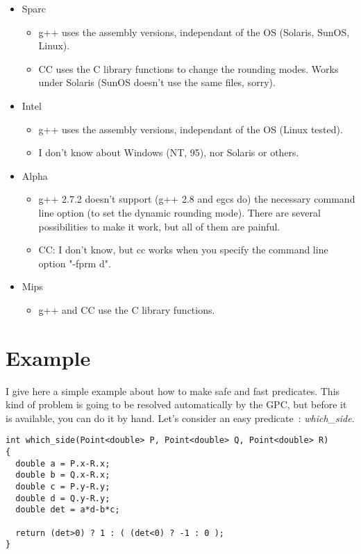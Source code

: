 \begin{itemize}
\item Sparc
\begin{itemize}
\item g++ uses the assembly versions, independant of the OS (Solaris, SunOS,
      Linux).
\item CC uses the C library functions to change the rounding modes.  Works
      under Solaris (SunOS doesn't use the same files, sorry).
\end{itemize}
\item Intel
\begin{itemize}
\item g++ uses the assembly versions, independant of the OS (Linux tested).
\item I don't know about Windows (NT, 95), nor Solaris or others.
\end{itemize}
\item Alpha
\begin{itemize}
\item g++ 2.7.2 doesn't support (g++ 2.8 and egcs do) the necessary command line
	option (to set the dynamic rounding mode).  There are several
	possibilities to make it work, but all of them are painful.
\item CC: I don't know, but cc works when you specify the command line option
      "-fprm d".
\end{itemize}
\item Mips
\begin{itemize}
\item g++ and CC use the C library functions.
\end{itemize}
\end{itemize}


\section{Example}

I give here a simple example about how to make safe and fast predicates.
This kind of problem is going to be resolved automatically by the GPC,
but before it is available, you can do it by hand.
Let's consider an easy predicate~: {\it which\_side}.

\begin{verbatim}
int which_side(Point<double> P, Point<double> Q, Point<double> R)
{
  double a = P.x-R.x;
  double b = Q.x-R.x;
  double c = P.y-R.y;
  double d = Q.y-R.y;
  double det = a*d-b*c;

  return (det>0) ? 1 : ( (det<0) ? -1 : 0 );
}
\end{verbatim}

